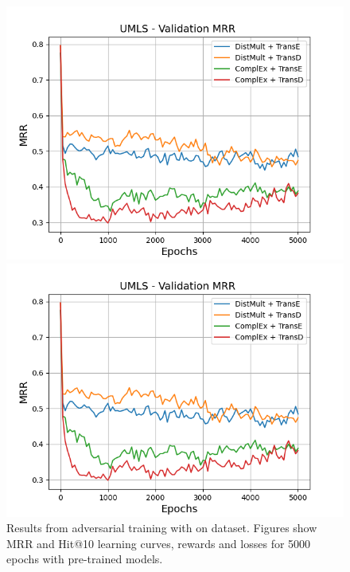 \begin{figure}
    \begin{minipage}{.45\textwidth}
      \centering
      \includegraphics[width=0.9\linewidth]{figures/results/gan_train/pretrained/uncertainty/max/entropy/umls/5k_epochs/uncertainty_umls_mrrs.png}
    \end{minipage}%
     \begin{minipage}{.45\textwidth}
      \centering
      \includegraphics[width=0.9\linewidth]{figures/results/gan_train/pretrained/uncertainty/max/entropy/umls/5k_epochs/uncertainty_umls_mrrs.png}
    \end{minipage}%
    \caption{Results from adversarial training with \usmax on \umls dataset.
    Figures show MRR and Hit@10 learning curves, rewards and losses for 5000 epochs with pre-trained models.}
    \label{fig:gan_train_pretrained_usmax_umls}
\end{figure}
